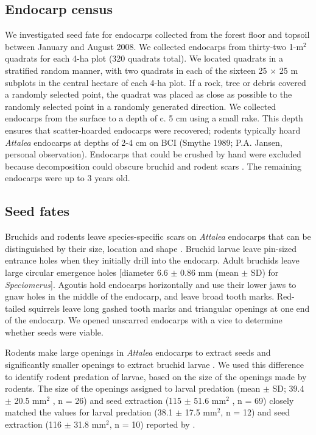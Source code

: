 \documentclass[b5paper,justified]{tufte-book} %
\begin{document}
\begin{fullwidth}
\subsection{Endocarp census}
We investigated seed fate for endocarps collected from the forest floor and topsoil between January and August 2008. We collected endocarps from thirty-two 1-m$^2$ quadrats for each 4-ha plot (320 quadrats total). We located quadrats in a stratified random manner, with two quadrats in each of the sixteen 25 $\times$ 25 m subplots in the central hectare of each 4-ha plot. If a rock, tree or debris covered a randomly selected point, the quadrat was placed as close as possible
to the randomly selected point in a randomly generated direction. We collected endocarps from the surface to a depth of c. 5 cm using a small rake. This depth ensures that scatter-hoarded endocarps were recovered; rodents typically hoard \textit{Attalea} endocarps at depths of 2-4 cm on BCI (Smythe 1989; P.A. Jansen, personal observation). Endocarps that could be crushed by hand were excluded because decomposition could obscure bruchid and rodent scars \citep[\textit{sensu}][]{Wright2001a}. The remaining endocarps were up to 3 years old. 

\subsection{Seed fates}
Bruchids and rodents leave species-specific scars on \textit{Attalea} endocarps that can be distinguished by their size, location and shape \citep{Silvius2002}. Bruchid larvae leave pin-sized entrance holes when they initially drill into the endocarp. Adult bruchids leave large circular emergence holes [diameter 6.6 $\pm$ 0.86 mm (mean $\pm$ SD) for \textit{Speciomerus}]. Agoutis hold endocarps horizontally and use their lower jaws \citep{Silvius2002} to
gnaw holes in the middle of the endocarp, and leave broad tooth marks. Red-tailed squirrels leave long gashed tooth marks and triangular openings at one end of the endocarp. We opened unscarred endocarps with a vice to determine whether seeds were viable. 

Rodents make large openings in \textit{Attalea} endocarps to extract seeds and significantly smaller openings to extract bruchid larvae \citep{Galvez2007}. We used this difference to identify rodent predation of larvae, based on the size of the openings made by rodents. The size of the openings assigned to larval predation (mean $\pm$ SD; 39.4 $\pm$
20.5 mm$^2$ , n = 26) and seed extraction (115 $\pm$ 51.6 mm$^2$ , n = 69) closely matched the values for larval predation (38.1 $\pm$ 17.5 mm$^2$, n = 12) and seed extraction (116 $\pm$ 31.8 mm$^2$, n = 10) reported by \citep{Galvez2007}.


\end{fullwidth}
\end{document}
